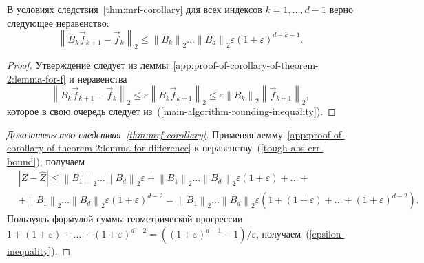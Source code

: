 \begin{lemma}
\label{app:proof-of-corollary-of-theorem-2:lemma-for-difference}
В условиях следствия~\ref{thm:mrf-corollary} для всех индексов $k = 1, \ldots, d - 1$ верно следующее неравенство:
\begin{equation}
\label{app:proof-of-corollary-of-theorem-2:lemma-for-difference:inequality}
\left\| B_k \vec{f}_{k + 1} - \vec{f}_k \right\|_2 \leq \left\| B_k \right\|_2 \ldots \left\| B_d \right\|_2 \varepsilon (1 + \varepsilon)^{d - k - 1}.
\end{equation}
\end{lemma}
\begin{proof}
Утверждение следует из леммы~\ref{app:proof-of-corollary-of-theorem-2:lemma-for-f} и неравенства
\begin{equation*}
\left\| B_k \vec{f}_{k + 1} - \vec{f}_k \right\|_2 \leq \varepsilon \left\| B_k \vec{f}_{k + 1} \right\|_2 \leq \varepsilon \left\| B_k \right\|_2 \left\| \vec{f}_{k + 1} \right\|_2,
\end{equation*}
которое в свою очередь следует из~(\ref{main-algorithm-rounding-inequality}).
\end{proof}


\begin{proof}[Доказательство следствия~\ref{thm:mrf-corollary}]
Применяя лемму~\ref{app:proof-of-corollary-of-theorem-2:lemma-for-difference} к неравенству~(\ref{tough-abs-err-bound}), получаем
\begin{align*}
&|Z - \widehat{Z}| \leq \left\| B_1 \right\|_2 \ldots \left\| B_d \right\|_2 \varepsilon +
\left\| B_1 \right\|_2 \ldots \left\| B_d \right\|_2 \varepsilon (1 + \varepsilon) + \ldots + \\
&+ \left\| B_1 \right\|_2 \ldots \left\| B_d \right\|_2 \varepsilon (1 + \varepsilon)^{d - 2} =
\left\| B_1 \right\|_2 \ldots \left\| B_d \right\|_2 \varepsilon (1 + (1 + \varepsilon) + \ldots + (1 + \varepsilon)^{d - 2}).
\end{align*}
Пользуясь формулой суммы геометрической прогрессии $1 + (1 + \varepsilon) + \ldots + (1 + \varepsilon)^{d - 2} = ((1 + \varepsilon)^{d - 1} - 1) / \varepsilon$, получаем~(\ref{epsilon-inequality}).
\end{proof}


